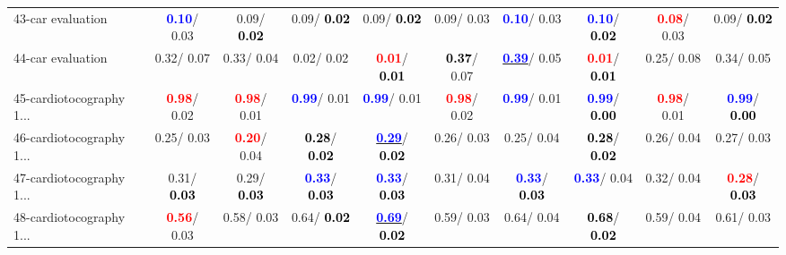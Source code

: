 \begin{table}[h]
\begin{center}
{\begin{tabular}{lc|c|c|c|c|c|c|c|c}
43-car evaluation & \textcolor{blue}{\textbf{  0.10}}/  0.03 &   0.09/\textcolor{black}{\textbf{  0.02}} &   0.09/\textcolor{black}{\textbf{  0.02}} &   0.09/\textcolor{black}{\textbf{  0.02}} &   0.09/  0.03 & \textcolor{blue}{\textbf{  0.10}}/  0.03 & \textcolor{blue}{\textbf{  0.10}}/\textcolor{black}{\textbf{  0.02}} & \textcolor{red}{\textbf{  0.08}}/  0.03 &   0.09/\textcolor{black}{\textbf{  0.02}} \\
44-car evaluation &   0.32/  0.07 &   0.33/  0.04 &   0.02/  0.02 & \textcolor{red}{\textbf{  0.01}}/\textcolor{black}{\textbf{  0.01}} & \textcolor{black}{\textbf{  0.37}}/  0.07 & \underline{\textcolor{blue}{\textbf{  0.39}}}/  0.05 & \textcolor{red}{\textbf{  0.01}}/\textcolor{black}{\textbf{  0.01}} &   0.25/  0.08 &   0.34/  0.05 \\
45-cardiotocography 1... & \textcolor{red}{\textbf{  0.98}}/  0.02 & \textcolor{red}{\textbf{  0.98}}/  0.01 & \textcolor{blue}{\textbf{  0.99}}/  0.01 & \textcolor{blue}{\textbf{  0.99}}/  0.01 & \textcolor{red}{\textbf{  0.98}}/  0.02 & \textcolor{blue}{\textbf{  0.99}}/  0.01 & \textcolor{blue}{\textbf{  0.99}}/\textcolor{black}{\textbf{  0.00}} & \textcolor{red}{\textbf{  0.98}}/  0.01 & \textcolor{blue}{\textbf{  0.99}}/\textcolor{black}{\textbf{  0.00}} \\
46-cardiotocography 1... &   0.25/  0.03 & \textcolor{red}{\textbf{  0.20}}/  0.04 & \textcolor{black}{\textbf{  0.28}}/\textcolor{black}{\textbf{  0.02}} & \underline{\textcolor{blue}{\textbf{  0.29}}}/\textcolor{black}{\textbf{  0.02}} &   0.26/  0.03 &   0.25/  0.04 & \textcolor{black}{\textbf{  0.28}}/\textcolor{black}{\textbf{  0.02}} &   0.26/  0.04 &   0.27/  0.03 \\ \hline
47-cardiotocography 1... &   0.31/\textcolor{black}{\textbf{  0.03}} &   0.29/\textcolor{black}{\textbf{  0.03}} & \textcolor{blue}{\textbf{  0.33}}/\textcolor{black}{\textbf{  0.03}} & \textcolor{blue}{\textbf{  0.33}}/\textcolor{black}{\textbf{  0.03}} &   0.31/  0.04 & \textcolor{blue}{\textbf{  0.33}}/\textcolor{black}{\textbf{  0.03}} & \textcolor{blue}{\textbf{  0.33}}/  0.04 &   0.32/  0.04 & \textcolor{red}{\textbf{  0.28}}/\textcolor{black}{\textbf{  0.03}} \\
48-cardiotocography 1... & \textcolor{red}{\textbf{  0.56}}/  0.03 &   0.58/  0.03 &   0.64/\textcolor{black}{\textbf{  0.02}} & \underline{\textcolor{blue}{\textbf{  0.69}}}/\textcolor{black}{\textbf{  0.02}} &   0.59/  0.03 &   0.64/  0.04 & \textcolor{black}{\textbf{  0.68}}/\textcolor{black}{\textbf{  0.02}} &   0.59/  0.04 &   0.61/  0.03 \\

\end{tabular}}
\end{center}
\end{table}
